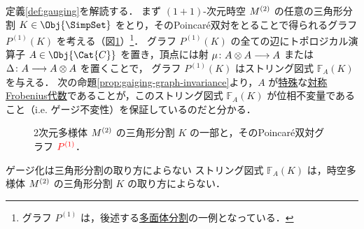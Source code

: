 \documentclass[TQFT_main]{subfiles}
\begin{document}
定義\ref{def:gauging}を解読する．
まず $(1+1)$-次元時空 $M^{(2)}$ の任意の三角形分割 $K \in \Obj{\SimpSet}$ 
をとり，そのPoincar\'{e}双対をとることで得られるグラフ $P^{(1)}(K)$ を考える（図\ref{fig:gauging-graph}）\footnote{グラフ $P^{(1)}$ は，後述する\hyperref[def:polytope-decomp]{多面体分割}の一例となっている．}．
グラフ $P^{(1)}(K)$ の全ての辺にトポロジカル演算子 $A \in \Obj{\Cat{C}}$ を置き，頂点には射 $\mu \colon A \otimes A \longrightarrow A$ または $\Delta \colon A \longrightarrow A \otimes A$ を置くことで，
グラフ $P^{(1)}(K)$ はストリング図式 $\mathbb{F}_A (K)$ を与える．
次の命題\ref{prop:gaiging-graph-invariance}より，$A$ が\hyperref[def:special-Frobenius]{特殊}な\hyperref[def:sym-Frobenius]{対称Frobenius代数}であることが，このストリング図式 $\mathbb{F}_A (K)$ が位相不変量であること（i.e. ゲージ不変性）を保証しているのだと分かる．
\begin{figure}[H]
    \centering
    \caption{2次元多様体 $M^{(2)}$ の三角形分割 $K$ の一部と，そのPoincar\'{e}双対グラフ $\textcolor{red}{P^{(1)}}$．}
    \label{fig:gauging-graph}
\end{figure}%

\begin{myprop}[label=prop:gaiging-graph-invariance]{ゲージ化は三角形分割の取り方によらない}
    ストリング図式 $\mathbb{F}_A (K)$ は，時空多様体 $M^{(2)}$ の三角形分割 $K$ の取り方によらない．
\end{myprop}
\end{document}
